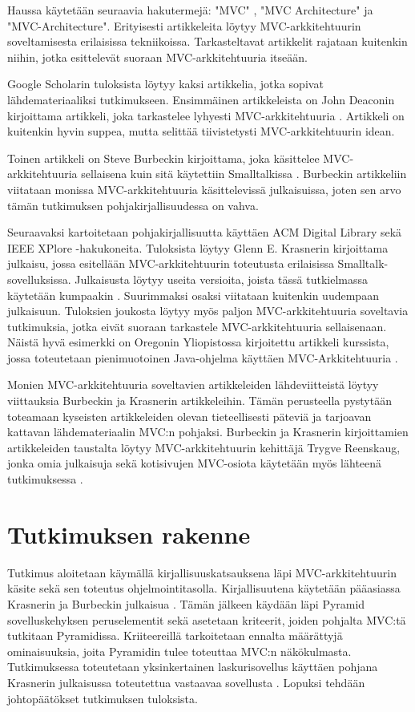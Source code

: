 \documentclass[finnish,utf8,nonumbib,palatino,kandi]{gradu2}
\begin{document}
Haussa käytetään seuraavia hakutermejä: "MVC" , "MVC Architecture" ja "MVC-Architecture".  Erityisesti
artikkeleita löytyy MVC-arkkitehtuurin soveltamisesta erilaisissa tekniikoissa. Tarkasteltavat artikkelit rajataan kuitenkin niihin, jotka esittelevät suoraan MVC-arkkitehtuuria itseään.  

Google Scholarin tuloksista löytyy kaksi artikkelia, jotka sopivat
lähdemateriaaliksi tutkimukseen. Ensimmäinen artikkeleista on John Deaconin kirjoittama artikkeli, joka 
tarkastelee lyhyesti MVC-arkkitehtuuria \cite{Deacon:1995}. Artikkeli on kuitenkin hyvin suppea, mutta
selittää tiivistetysti MVC-arkkitehtuurin idean.

Toinen artikkeli on Steve Burbeckin kirjoittama, joka käsittelee MVC-arkkitehtuuria sellaisena kuin 
sitä käytettiin Smalltalkissa \cite{Burbeck}. Burbeckin artikkeliin viitataan
monissa MVC-arkkitehtuuria käsittelevissä julkaisuissa, joten sen arvo tämän tutkimuksen pohjakirjallisuudessa on vahva. 

Seuraavaksi kartoitetaan pohjakirjallisuutta käyttäen ACM Digital Library sekä IEEE XPlore -hakukoneita. Tuloksista löytyy Glenn E.
Krasnerin kirjoittama julkaisu, jossa esitellään MVC-arkkitehtuurin toteutusta erilaisissa Smalltalk-sovelluksissa. Julkaisusta löytyy useita versioita, joista tässä tutkielmassa käytetään kumpaakin \cite{Krasner} \cite{Krasner:desc}.  Suurimmaksi osaksi viitataan kuitenkin uudempaan julkaisuun. Tuloksien joukosta
löytyy myös paljon MVC-arkkitehtuuria soveltavia tutkimuksia, jotka eivät suoraan tarkastele MVC-arkkitehtuuria sellaisenaan. Näistä hyvä esimerkki on
Oregonin Yliopistossa kirjoitettu artikkeli kurssista, jossa toteutetaan pienimuotoinen Java-ohjelma käyttäen MVC-Arkkitehtuuria \cite{Morse}. 

Monien MVC-arkkitehtuuria soveltavien artikkeleiden lähdeviitteistä löytyy viittauksia Burbeckin ja Krasnerin artikkeleihin. Tämän perusteella pystytään
toteamaan kyseisten artikkeleiden olevan tieteellisesti päteviä ja tarjoavan kattavan lähdemateriaalin MVC:n pohjaksi. Burbeckin ja Krasnerin kirjoittamien artikkeleiden taustalta löytyy 
MVC-arkkitehtuurin kehittäjä Trygve Reenskaug, jonka omia julkaisuja sekä kotisivujen MVC-osiota
käytetään myös lähteenä tutkimuksessa \cite{Reenskaug}. 

\section {Tutkimuksen rakenne}
Tutkimus aloitetaan käymällä kirjallisuuskatsauksena läpi MVC-arkkitehtuurin käsite sekä sen toteutus ohjelmointitasolla. Kirjallisuutena käytetään
pääasiassa Krasnerin ja Burbeckin julkaisua \cite{Krasner:desc, Burbeck}. Tämän jälkeen käydään läpi Pyramid sovelluskehyksen peruselementit sekä asetetaan
kriteerit, joiden pohjalta MVC:tä tutkitaan Pyramidissa. Kriiteereillä tarkoitetaan ennalta määrättyjä ominaisuuksia, joita Pyramidin tulee toteuttaa MVC:n näkökulmasta.  Tutkimuksessa toteutetaan yksinkertainen laskurisovellus käyttäen pohjana 
Krasnerin julkaisussa toteutettua vastaavaa sovellusta \cite{Krasner:desc}. Lopuksi tehdään johtopäätökset tutkimuksen tuloksista. 
\end{document}
